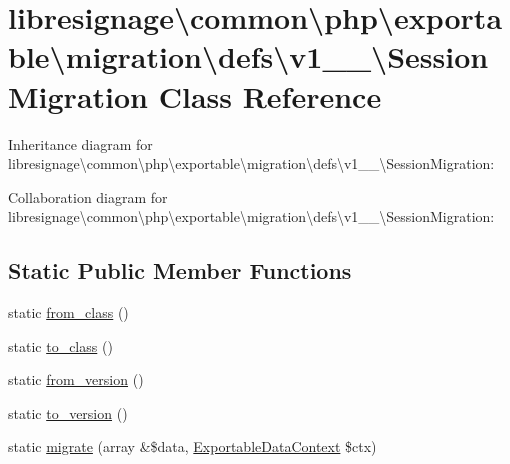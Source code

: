 \hypertarget{classlibresignage_1_1common_1_1php_1_1exportable_1_1migration_1_1defs_1_1v1__0__0_1_1SessionMigration}{}\section{libresignage\textbackslash{}common\textbackslash{}php\textbackslash{}exportable\textbackslash{}migration\textbackslash{}defs\textbackslash{}v1\+\_\+\_\textbackslash{}Session\+Migration Class Reference}
\label{classlibresignage_1_1common_1_1php_1_1exportable_1_1migration_1_1defs_1_1v1__0__0_1_1SessionMigration}


Inheritance diagram for libresignage\textbackslash{}common\textbackslash{}php\textbackslash{}exportable\textbackslash{}migration\textbackslash{}defs\textbackslash{}v1\+\_\+\_\textbackslash{}Session\+Migration\+:


Collaboration diagram for libresignage\textbackslash{}common\textbackslash{}php\textbackslash{}exportable\textbackslash{}migration\textbackslash{}defs\textbackslash{}v1\+\_\+\_\textbackslash{}Session\+Migration\+:
\subsection*{Static Public Member Functions}
\begin{DoxyCompactItemize}
\item 
static \hyperlink{classlibresignage_1_1common_1_1php_1_1exportable_1_1migration_1_1defs_1_1v1__0__0_1_1SessionMigration_a1d09414946c5894b5d68aac4f719c213}{from\+\_\+class} ()
\item 
static \hyperlink{classlibresignage_1_1common_1_1php_1_1exportable_1_1migration_1_1defs_1_1v1__0__0_1_1SessionMigration_adda11b969684868d4cfd93186f52f805}{to\+\_\+class} ()
\item 
static \hyperlink{classlibresignage_1_1common_1_1php_1_1exportable_1_1migration_1_1defs_1_1v1__0__0_1_1SessionMigration_ab7474016078bf00abab890c7fac26cc4}{from\+\_\+version} ()
\item 
static \hyperlink{classlibresignage_1_1common_1_1php_1_1exportable_1_1migration_1_1defs_1_1v1__0__0_1_1SessionMigration_ae550884b97a5fa9dff765005859d69ac}{to\+\_\+version} ()
\item 
static \hyperlink{classlibresignage_1_1common_1_1php_1_1exportable_1_1migration_1_1defs_1_1v1__0__0_1_1SessionMigration_aa6e5271cd3e41dc7695c2625e1935a76}{migrate} (array \&\$data, \hyperlink{classlibresignage_1_1common_1_1php_1_1exportable_1_1ExportableDataContext}{Exportable\+Data\+Context} \$ctx)
\end{DoxyCompactItemize}


